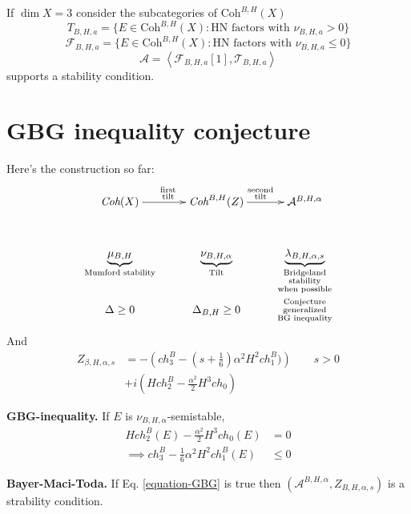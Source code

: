 \medskip\noindent
If $\dim X=3$ consider the subcategories of $\text{Coh}^{B,H}(X)$
$$
T_{B,H,a}=\{E \in \text{Coh}^{B,H}(X):\text{HN factors with }
\nu_{B,H,a}>0\}
$$
$$
\mathcal{F}_{B,H,a}=\{E \in \text{Coh}^{B,H}(X):\text{HN factors with }
\nu_{B,H,a}\leq 0\}
$$
$$
\mathcal{A}=\left<\mathcal{F}_{B,H,a}[1],\mathcal{T}_{B,H,a}\right>
$$
supports a stability condition.

\section{GBG inequality conjecture}
\label{section-GBG-inequality-conjecture}

Here's the construction so far:
$$
\xymatrixrowsep{1.4em}
\xymatrix{
\textit{Coh}(X)\ar[r]^{\substack{\text{first} \\ \text{tilt}}}
&  \textit{Coh}^{B,H}(Z)\ar[r]^{\substack{\text{second} \\ \text{tilt}}}
&  \mathcal{A}^{B,H,\alpha}\\
\underbrace{\mu_{B,H}}_{\text{Mumford stability}}
&  \underbrace{\nu_{B,H,\alpha}}_{\text{Tilt}}
&  \underbrace{\lambda_{B,H,\alpha,s}}
_{\substack{\text{Bridgeland} \\ \text{stability}\\\text{when possible}}}\\
\Delta \geq 0
&  \Delta_{B,H}\geq 0
&\substack{\text{Conjecture} \\ \text{generalized}\\\text{BG inequality}}
}
$$
And
\begin{align*}
Z_{\beta,H,\alpha,s}&=-\left(ch^B_3-\left(s+\frac{1}{6}\right)\alpha^2
H^2ch_1^B)\right)\qquad s>0\\
&+i\left(Hch_2^B-\frac{\alpha^2}{2}H^3ch_0\right) 
\end{align*}

\medskip\noindent
{\bf GBG-inequality.} If $E$ is $\nu_{B,H,\alpha}$-semistable,
\begin{equation}
\label{equation-GBG}
\begin{aligned}
H ch_2^B(E)-\frac{\alpha^2}{2}H^3 ch_0(E)&=0\\
\implies ch_3^{B}-\frac{1}{6}\alpha^2H^2ch_1^B(E)&\leq 0
\end{aligned}
\end{equation}

\medskip\noindent
{\bf Bayer-Maci-Toda.} If Eq. \ref{equation-GBG} is true then 
$(\mathcal{A}^{B,H,\alpha},Z_{B,H,\alpha,s})$ is a strability condition.

